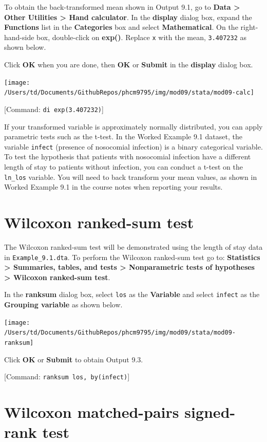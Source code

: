 \documentclass[
]{memoir}
\begin{document}
To obtain the back-transformed mean shown in Output 9.1, go to \textbf{Data \textgreater{} Other Utilities \textgreater{} Hand calculator}. In the \textbf{display} dialog box, expand the \textbf{Functions} list in the \textbf{Categories} box and select \textbf{Mathematical}. On the right-hand-side box, double-click on \textbf{exp()}. Replace \texttt{x} with the mean, \texttt{3.407232} as shown below.

Click \textbf{OK} when you are done, then \textbf{OK} or \textbf{Submit} in the \textbf{display} dialog box.

\texttt{[image: /Users/td/Documents/GithubRepos/phcm9795/img/mod09/stata/mod09-calc]}

{[}Command: \texttt{di\ exp(3.407232)}{]}

If your transformed variable is approximately normally distributed, you can apply parametric tests such as the t-test. In the Worked Example 9.1 dataset, the variable \texttt{infect} (presence of nosocomial infection) is a binary categorical variable. To test the hypothesis that patients with nosocomial infection have a different length of stay to patients without infection, you can conduct a t-test on the \texttt{ln\_los} variable. You will need to back transform your mean values, as shown in Worked Example 9.1 in the course notes when reporting your results.

\hypertarget{wilcoxon-ranked-sum-test}{%
\section{Wilcoxon ranked-sum test}\label{wilcoxon-ranked-sum-test}}

The Wilcoxon ranked-sum test will be demonstrated using the length of stay data in \texttt{Example\_9.1.dta}. To perform the Wilcoxon ranked-sum test go to: \textbf{Statistics \textgreater{} Summaries, tables, and tests \textgreater{} Nonparametric tests of hypotheses \textgreater{} Wilcoxon ranked-sum test}.

In the \textbf{ranksum} dialog box, select \texttt{los} as the \textbf{Variable} and select \texttt{infect} as the \textbf{Grouping variable} as shown below.

\texttt{[image: /Users/td/Documents/GithubRepos/phcm9795/img/mod09/stata/mod09-ranksum]}

Click \textbf{OK} or \textbf{Submit} to obtain Output 9.3.

{[}Command: \texttt{ranksum\ los,\ by(infect)}{]}

\hypertarget{wilcoxon-matched-pairs-signed-rank-test}{%
\section{Wilcoxon matched-pairs signed-rank test}\label{wilcoxon-matched-pairs-signed-rank-test}}
\end{document}

